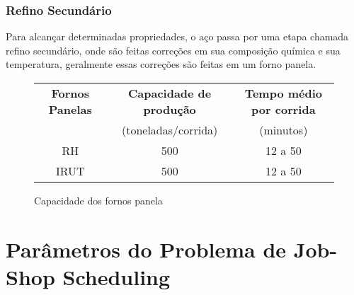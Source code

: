 \subsubsection{Refino Secundário}
Para alcançar determinadas propriedades, o aço passa por uma etapa chamada refino secundário, onde são feitas correções em sua composição química e sua temperatura, geralmente essas correções são feitas em um forno panela.


\begin{figure}[H]
\begin{center}
  \begin{tabular}{|c|c|c|}
    \hline
    {\bf Fornos Panelas} & {\bf Capacidade de produção} & {\bf Tempo médio por corrida} \\
    $\quad$ & (toneladas/corrida)        &    (minutos) \\ \hline
    RH & 500 & 12 a 50 \\ \hline
   IRUT & 500 & 12 a 50 \\ \hline
    
  \end{tabular}
\end{center}
\caption{Capacidade dos fornos panela}
\end{figure}





\section{Parâmetros do Problema de Job-Shop Scheduling}



